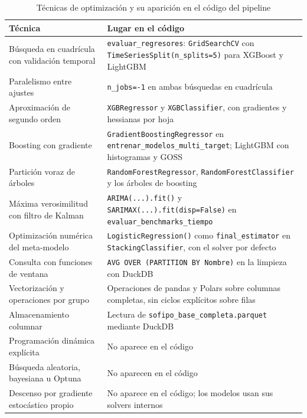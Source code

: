 \begin{table}[htbp]
\centering
\small
\caption{Técnicas de optimización y su aparición en el código del pipeline}
\label{tab:opt_codigo}
\begin{tabularx}{\textwidth}{>{\raggedright\arraybackslash}p{4.2cm}>{\raggedright\arraybackslash}X}
\toprule
Técnica & Lugar en el código \\
\midrule
Búsqueda en cuadrícula con validación temporal & \texttt{evaluar\_regresores}: \texttt{GridSearchCV} con \texttt{TimeSeriesSplit(n\_splits=5)} para XGBoost y LightGBM \\
Paralelismo entre ajustes & \texttt{n\_jobs=-1} en ambas búsquedas en cuadrícula \\
Aproximación de segundo orden & \texttt{XGBRegressor} y \texttt{XGBClassifier}, con gradientes y hessianas por hoja \\
Boosting con gradiente & \texttt{GradientBoostingRegressor} en \texttt{entrenar\_modelos\_multi\_target}; LightGBM con histogramas y GOSS \\
Partición voraz de árboles & \texttt{RandomForestRegressor}, \texttt{RandomForestClassifier} y los árboles de boosting \\
Máxima verosimilitud con filtro de Kalman & \texttt{ARIMA(...).fit()} y \texttt{SARIMAX(...).fit(disp=False)} en \texttt{evaluar\_benchmarks\_tiempo} \\
Optimización numérica del meta-modelo & \texttt{LogisticRegression()} como \texttt{final\_estimator} en \texttt{StackingClassifier}, con el solver por defecto \\
Consulta con funciones de ventana & \texttt{AVG OVER (PARTITION BY Nombre)} en la limpieza con DuckDB \\
Vectorización y operaciones por grupo & Operaciones de pandas y Polars sobre columnas completas, sin ciclos explícitos sobre filas \\
Almacenamiento columnar & Lectura de \texttt{sofipo\_base\_completa.parquet} mediante DuckDB \\
Programación dinámica explícita & No aparece en el código \\
Búsqueda aleatoria, bayesiana u Optuna & No aparecen en el código \\
Descenso por gradiente estocástico propio & No aparece en el código; los modelos usan sus solvers internos \\
\bottomrule
\end{tabularx}
\end{table}

